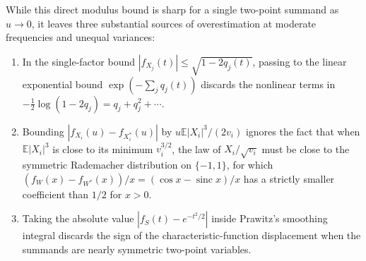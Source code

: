 \documentclass[11pt]{article}
\numberwithin{equation}{section}
\theoremstyle{remark}
\DeclareMathOperator{\sinc}{sinc}
\newcommand{\E}{\mathbb E}
\begin{document}
While this direct modulus bound is sharp for a single two-point summand as
$u\to0$, it leaves three substantial sources of overestimation at moderate
frequencies and unequal variances:
\begin{enumerate}[label=(\roman*),leftmargin=2em]
\item In the single-factor bound $|f_{X_j}(t)|\le\sqrt{1-2q_j(t)}$, passing to
the linear exponential bound $\exp(-\sum_jq_j(t))$ discards the nonlinear
terms in $-\frac12\log(1-2q_j)=q_j+q_j^2+\cdots$.
\item Bounding $|f_{X_i}(u)-f_{X_i^*}(u)|$ by $u\E|X_i|^3/(2v_i)$ ignores the
fact that when $\E|X_i|^3$ is close to its minimum $v_i^{3/2}$, the law of
$X_i/\sqrt{v_i}$ must be close to the symmetric Rademacher distribution on
$\{-1,1\}$, for which $(f_W(x)-f_{W^*}(x))/x=(\cos x-\sinc x)/x$ has a
strictly smaller coefficient than $1/2$ for $x>0$.
\item Taking the absolute value $|f_S(t)-e^{-t^2/2}|$ inside Prawitz's
smoothing integral discards the sign of the characteristic-function
displacement when the summands are nearly symmetric two-point variables.
\end{enumerate}
\end{document}
